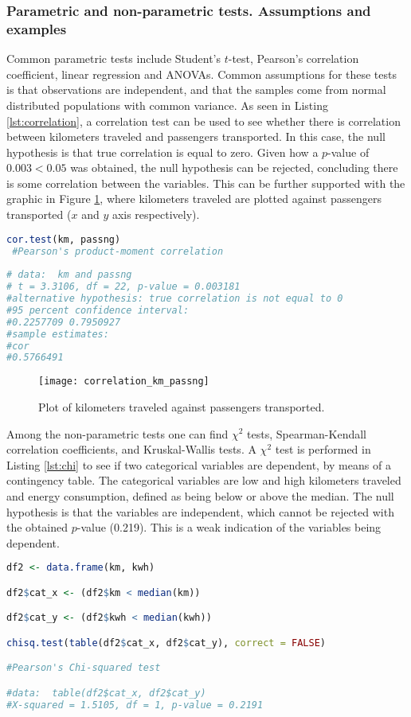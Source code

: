\documentclass[letterpaper, 10 pt, conference]{article}
\begin{document}
\subsubsection{Parametric and non-parametric tests. Assumptions and examples}
Common parametric tests include Student's $t$-test, Pearson's correlation coefficient, linear regression and ANOVAs. Common assumptions for these tests is that observations are independent, and that the samples come from normal distributed populations with common variance. As seen in Listing \ref{lst:correlation}, a correlation test can be used to see whether there is correlation between kilometers traveled and passengers transported. In this case, the null hypothesis is that true correlation is equal to zero. Given how a $p$-value of $0.003 < 0.05$ was obtained, the null hypothesis can be rejected, concluding there is some correlation between the variables. This can be further supported with the graphic in Figure \ref{fig:correlation}, where kilometers traveled are plotted against passengers transported ($x$ and $y$ axis respectively).
 \begin{lstlisting}[language=R, caption={Correlation test.}, label={lst:correlation} ]
 cor.test(km, passng)
 #Pearson's product-moment correlation
 
# data:  km and passng
# t = 3.3106, df = 22, p-value = 0.003181
#alternative hypothesis: true correlation is not equal to 0
#95 percent confidence interval:
#0.2257709 0.7950927
#sample estimates:
#cor 
#0.5766491 
 \end{lstlisting}
 
 \begin{figure}
 	\centering
 	\texttt{[image: correlation\_km\_passng]}
 	\caption{Plot of kilometers traveled against passengers transported.}
 	\label{fig:correlation}
 \end{figure}
 
 
 Among the non-parametric tests one can find $\chi^2$  tests, Spearman-Kendall correlation coefficients, and Kruskal-Wallis tests. A $\chi^2$ test is performed in Listing \ref{lst:chi} to see if two categorical variables are dependent, by means of a contingency table. The categorical variables are low and high kilometers traveled and energy consumption, defined as being below or above the median. The null hypothesis is that the variables are independent, which cannot be rejected with the obtained $p$-value (0.219). This is a weak indication of the variables being dependent.
  \begin{lstlisting}[language=R, caption={Chi Squared test.}, label={lst:chi} ]
df2 <- data.frame(km, kwh)

df2$cat_x <- (df2$km < median(km))

df2$cat_y <- (df2$kwh < median(kwh))

chisq.test(table(df2$cat_x, df2$cat_y), correct = FALSE) 

#Pearson's Chi-squared test

#data:  table(df2$cat_x, df2$cat_y)
#X-squared = 1.5105, df = 1, p-value = 0.2191
 \end{lstlisting}
 
\end{document}
